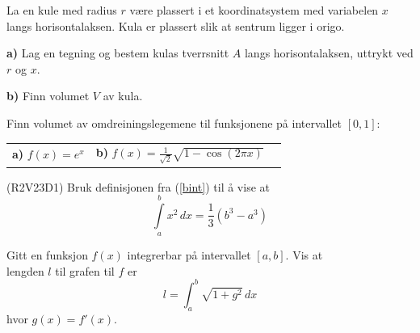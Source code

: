 \nes
{}
La en kule med radius $ r $ være plassert i et koordinatsystem med variabelen $ x $ langs horisontalaksen. Kula er plassert slik at sentrum ligger i origo.\os

\textbf{a)} Lag en tegning og bestem kulas tverrsnitt $ A $ langs horisontalaksen, uttrykt ved $ r $ og $ x $.\os

\textbf{b)} Finn volumet $ V $ av kula.

Finn volumet av omdreiningslegemene til funksjonene på intervallet $ [0, 1] $:\os

\begin{tabular}{@{}l l l}	
	\textbf{a)} $ f(x)=e^x  $&\quad\textbf{b)} $\displaystyle f(x)= \frac{1}{\sqrt{2}}\sqrt{1-\cos(2 \pi x)}$ &\quad
\end{tabular}
\newpage
{}
(R2V23D1)
Bruk definisjonen fra (\ref{bint}) til å vise at
\[ \int\limits_a^b x^2 \,dx = \frac{1}{3}(b^3-a^3) \]

Gitt en funksjon $ f(x) $ integrerbar på intervallet $ [a, b] $. Vis at \\lengden $ l $ til grafen til $ f $ er
\[ l=\int_{a}^{b} \sqrt{1+g^2}\,dx \]
hvor $ g(x)=f'(x) $.

